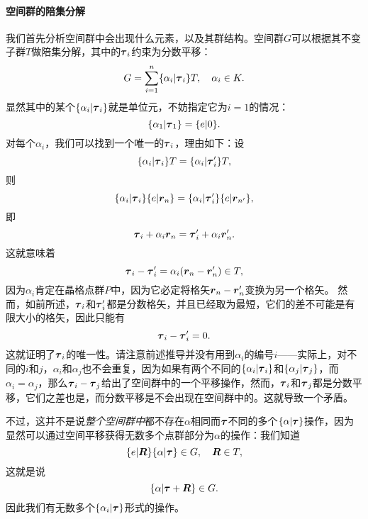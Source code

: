 \paragraph{空间群的陪集分解} 我们首先分析空间群中会出现什么元素，以及其群结构。空间群$G$可以根据其不变子群$T$做陪集分解，其中的$\vb*{\tau}_i$约束为分数平移：
\begin{equation}
    G = \sum_{i=1}^n \{ \alpha_i | \vb*{\tau}_i \} T, \quad \alpha_i \in K.
    \label{eq:coset-space-group}
\end{equation}
显然其中的某个$\{\alpha_i | \vb*{\tau}_i \}$就是单位元，不妨指定它为$i=1$的情况：
\begin{equation}
    \{\alpha_1 | \vb*{\tau}_1 \} = \{ e | 0 \}.
\end{equation}
对每个$\alpha_i$，我们可以找到一个唯一的$\vb*{\tau}_i$，理由如下：设
\[
    \{\alpha_i | \vb*{\tau}_i \} T = \{ \alpha_i | \vb*{\tau}'_i \} T,
\]
则
\[
    \{\alpha_i | \vb*{\tau}_i \} \{ e | \vb*{r}_n \} = \{\alpha_i | \vb*{\tau}'_i \} \{ e | \vb*{r}_{n'} \},
\]
即
\[
    \vb*{\tau}_i + \alpha_i \vb*{r}_n = \vb*{\tau}_i' + \alpha_i \vb*{r}_n'.
\]
这就意味着
\[
    \vb*{\tau}_i - \vb*{\tau}_i' = \alpha_i (\vb*{r}_n - \vb*{r}_n') \in T,
\]
因为$\alpha_i$肯定在晶格点群$P$中，因为它必定将格矢$\vb*{r}_n - \vb*{r}_n'$变换为另一个格矢。
然而，如前所述，$\vb*{\tau}_i$和$\vb*{\tau}_i'$都是分数格矢，并且已经取为最短，它们的差不可能是有限大小的格矢，因此只能有
\[
    \vb*{\tau}_i - \vb*{\tau}_i' = 0.
\]
这就证明了$\vb*{\tau}_i$的唯一性。请注意前述推导并没有用到$\alpha_i$的编号$i$——实际上，对不同的$i$和$j$，$\alpha_i$和$\alpha_j$也不会重复，因为如果有两个不同的$\{\alpha_i | \vb*{\tau}_i \}$和$\{\alpha_j | \vb*{\tau}_j \}$，而$\alpha_i = \alpha_j$，那么$\vb*{\tau}_i - \vb*{\tau}_j$给出了空间群中的一个平移操作，然而，$\vb*{\tau}_i$和$\vb*{\tau}_j$都是分数平移，它们之差也是，而分数平移是不会出现在空间群中的。这就导致一个矛盾。

不过，这并不是说\emph{整个空间群中}都不存在$\alpha$相同而$\vb*{\tau}$不同的多个$\{ \alpha | \vb*{\tau} \}$操作，因为显然可以通过空间平移获得无数多个点群部分为$\alpha$的操作：我们知道
\[
    \{e | \vb*{R}\} \{\alpha | \vb*{\tau}\} \in G, \quad \vb*{R} \in T,
\]
这就是说
\[
    \{\alpha | \vb*{\tau} + \vb*{R} \} \in G.
\]
因此我们有无数多个$\{ \alpha_i | \vb*{\tau} \}$形式的操作。

